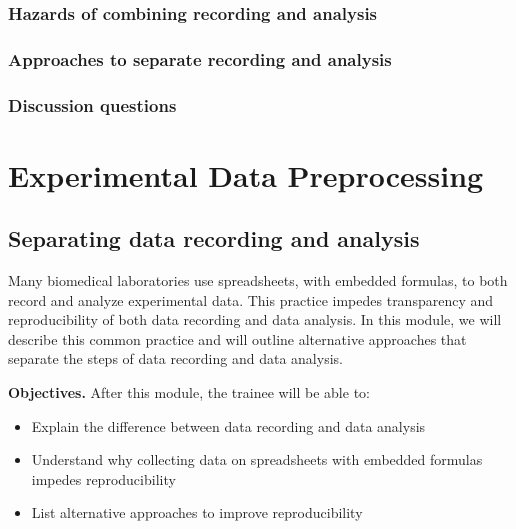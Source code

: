 \documentclass[]{tufte-book}
\providecommand{\tightlist}{%
  \setlength{\itemsep}{0pt}\setlength{\parskip}{0pt}}
\begin{document}
\hypertarget{hazards-of-combining-recording-and-analysis-7}{%
\subsection{Hazards of combining recording and analysis}\label{hazards-of-combining-recording-and-analysis-7}}

\hypertarget{approaches-to-separate-recording-and-analysis-7}{%
\subsection{Approaches to separate recording and analysis}\label{approaches-to-separate-recording-and-analysis-7}}

\hypertarget{discussion-questions-7}{%
\subsection{Discussion questions}\label{discussion-questions-7}}

\hypertarget{experimental-data-preprocessing}{%
\chapter{Experimental Data Preprocessing}\label{experimental-data-preprocessing}}

\hypertarget{separating-data-recording-and-analysis-8}{%
\section{Separating data recording and analysis}\label{separating-data-recording-and-analysis-8}}

Many biomedical laboratories use spreadsheets, with embedded formulas, to both
record and analyze experimental data. This practice impedes transparency and
reproducibility of both data recording and data analysis. In this module, we
will describe this common practice and will outline alternative approaches that
separate the steps of data recording and data analysis.

\textbf{Objectives.} After this module, the trainee will be able to:

\begin{itemize}
\tightlist
\item
  Explain the difference between data recording and data analysis
\item
  Understand why collecting data on spreadsheets with embedded formulas impedes
  reproducibility
\item
  List alternative approaches to improve reproducibility
\end{itemize}
\end{document}

